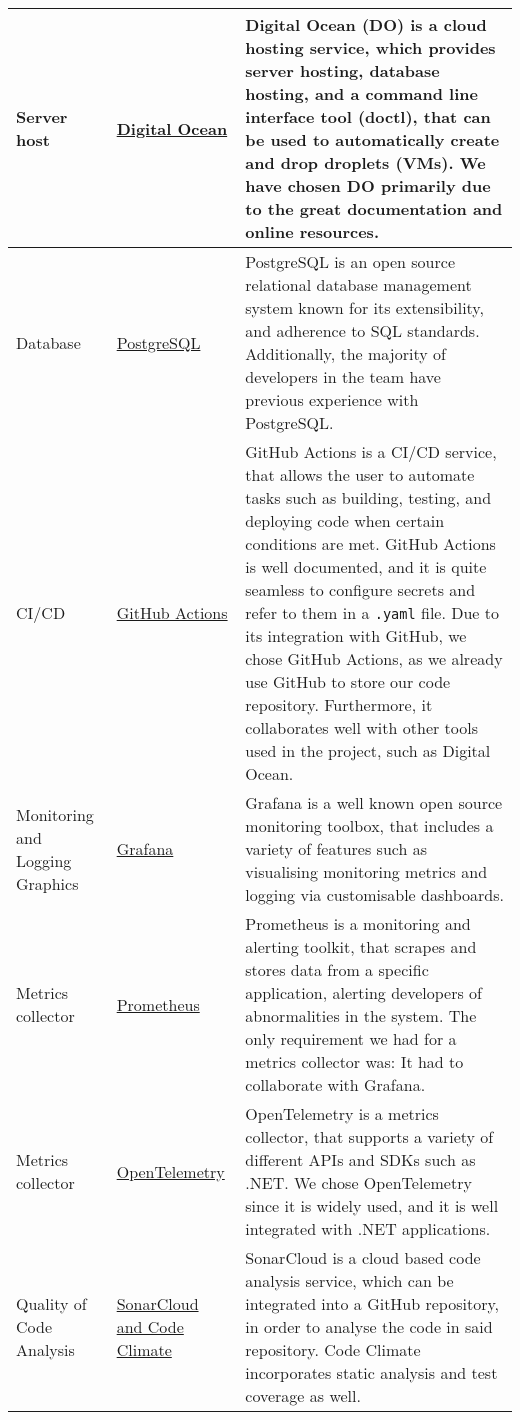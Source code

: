 \begin{longtable}{|p{}|p{} | p{}|}
    \hline
    Server host & \href{https://docs.digitalocean.com/}{Digital Ocean} & Digital Ocean (DO) is a cloud hosting service, which provides server hosting, database hosting, and a command line interface tool (doctl), that can be used to automatically create and drop droplets (VMs). We have chosen DO primarily due to the great documentation and online resources.\\
    \hline
    Database & \href{https://www.postgresql.org/docs/}{PostgreSQL} & PostgreSQL is an open source relational database management system known for its extensibility, and adherence to SQL standards. Additionally, the majority of developers in the team have previous experience with PostgreSQL.\\
    \hline
    CI/CD & \href{https://docs.github.com/en/actions}{GitHub Actions} & GitHub Actions is a CI/CD service, that allows the user to automate tasks such as building, testing, and deploying code when certain conditions are met. GitHub Actions is well documented, and it is quite seamless to configure secrets and refer to them in a \texttt{.yaml} file. Due to its integration with GitHub, we chose GitHub Actions, as we already use GitHub to store our code repository. Furthermore, it collaborates well with other tools used in the project, such as Digital Ocean.\\
    \hline
    Monitoring and Logging Graphics & \href{https://grafana.com/}{Grafana} & Grafana is a well known open source monitoring toolbox, that includes a variety of features such as visualising monitoring metrics and logging via customisable dashboards.\\
    \hline
    Metrics collector & \href{https://prometheus.io/docs/}{Prometheus} & Prometheus is a monitoring and alerting toolkit, that scrapes and stores data from a specific application, alerting developers of abnormalities in the system. The only requirement we had for a metrics collector was: It had to collaborate with Grafana.\\
    \hline
    Metrics collector & \href{https://opentelemetry.io/docs/languages/}{OpenTelemetry} & OpenTelemetry is a metrics collector, that supports a variety of different APIs and SDKs such as .NET. We chose OpenTelemetry since it is widely used, and it is well integrated with .NET applications.\\
    \hline
    Quality of Code Analysis & \href{https://www.sonarsource.com/products/sonarcloud/}{SonarCloud and Code Climate} & SonarCloud is a cloud based code analysis service, which can be integrated into a GitHub repository, in order to analyse the code in said repository. Code Climate incorporates static analysis and test coverage as well.\\

\end{longtable}
